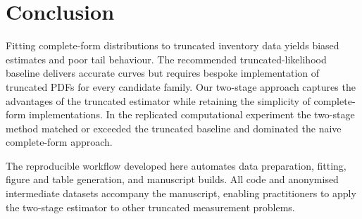 \section{Conclusion}

\label{sec:conclusion}

Fitting complete-form distributions to truncated inventory data yields biased estimates and poor tail behaviour. The recommended truncated-likelihood baseline delivers accurate curves but requires bespoke implementation of truncated PDFs for every candidate family. Our two-stage approach captures the advantages of the truncated estimator while retaining the simplicity of complete-form implementations. In the replicated computational experiment the two-stage method matched or exceeded the truncated baseline and dominated the naive complete-form approach.

The reproducible workflow developed here automates data preparation, fitting, figure and table generation, and manuscript builds. All code and anonymised intermediate datasets accompany the manuscript, enabling practitioners to apply the two-stage estimator to other truncated measurement problems.

